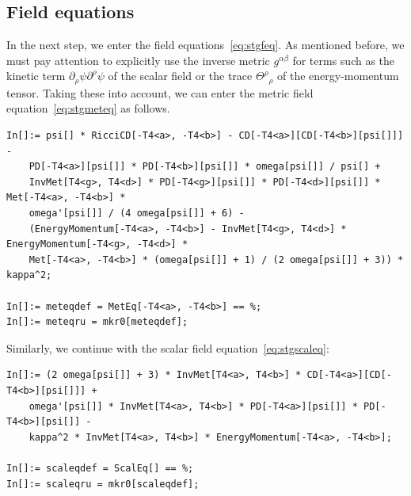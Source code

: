 \documentclass[notitlepage,a4paper,aps,prd,onecolumn,superscriptaddress,nofootinbib,groupedaddress,longbibliography]{revtex4-1}
\begin{document}
\subsection{Field equations}\label{ssec:fieldeq}
In the next step, we enter the field equations~\eqref{eq:stgfeq}. As mentioned before, we must pay attention to explicitly use the inverse metric \(g^{\alpha\beta}\) for terms such as the kinetic term \(\partial_{\rho}\psi\partial^{\rho}\psi\) of the scalar field or the trace \(\Theta^{\rho}{}_{\rho}\) of the energy-momentum tensor. Taking these into account, we can enter the metric field equation~\eqref{eq:stgmeteq} as follows.
\begin{lstlisting}
In[]:= psi[] * RicciCD[-T4<a>, -T4<b>] - CD[-T4<a>][CD[-T4<b>][psi[]]] -
	PD[-T4<a>][psi[]] * PD[-T4<b>][psi[]] * omega[psi[]] / psi[] +
	InvMet[T4<g>, T4<d>] * PD[-T4<g>][psi[]] * PD[-T4<d>][psi[]] * Met[-T4<a>, -T4<b>] *
	omega'[psi[]] / (4 omega[psi[]] + 6) -
	(EnergyMomentum[-T4<a>, -T4<b>] - InvMet[T4<g>, T4<d>] * EnergyMomentum[-T4<g>, -T4<d>] *
	Met[-T4<a>, -T4<b>] * (omega[psi[]] + 1) / (2 omega[psi[]] + 3)) * kappa^2;

In[]:= meteqdef = MetEq[-T4<a>, -T4<b>] == %;
In[]:= meteqru = mkr0[meteqdef];
\end{lstlisting}
Similarly, we continue with the scalar field equation~\eqref{eq:stgscaleq}:
\begin{lstlisting}
In[]:= (2 omega[psi[]] + 3) * InvMet[T4<a>, T4<b>] * CD[-T4<a>][CD[-T4<b>][psi[]]] +
	omega'[psi[]] * InvMet[T4<a>, T4<b>] * PD[-T4<a>][psi[]] * PD[-T4<b>][psi[]] -
	kappa^2 * InvMet[T4<a>, T4<b>] * EnergyMomentum[-T4<a>, -T4<b>];

In[]:= scaleqdef = ScalEq[] == %;
In[]:= scaleqru = mkr0[scaleqdef];
\end{lstlisting}
\end{document}

